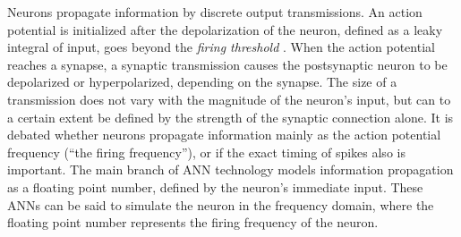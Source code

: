 	Neurons propagate information by discrete output transmissions.
	An action potential is initialized after the depolarization of the neuron, defined as a leaky integral of input, goes beyond the \emph{firing threshold} \cite{PurvesNeuroscience}.
	When the action potential reaches a synapse, a synaptic transmission causes the postsynaptic neuron to be depolarized or hyperpolarized, depending on the synapse. 
 	The size of a transmission does not vary with the magnitude of the neuron's input, 
 		but can to a certain extent be defined by the strength of the synaptic connection alone\cite{PrinciplesOfNeuralScience4edKAP10}.
	It is debated whether neurons propagate information mainly as the action potential frequency (``the firing frequency''), or if the exact timing of spikes also is important\cite{gerstnerKistler2002, PrinciplesOfNeuralScience4edKAP30, PrinciplesOfNeuralScience4edKAP21, TrevesNeuralNetworks}. %
	The main branch of ANN technology models information propagation as a floating point number, defined by the neuron's immediate input\cite{NeuralNetworksForAppliedSciencesAndEngineering}.
	These ANNs can be said to simulate the neuron in the frequency domain, where the floating point number represents the firing frequency of the neuron\cite{ FDP_report, NeuralNetworksForAppliedSciencesAndEngineering}.


